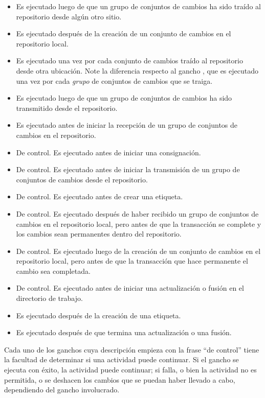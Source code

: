 \begin{itemize}
\item[\small\hook{changegroup}] Es ejecutado luego de que un grupo de
    conjuntos de cambios ha sido traído al repositorio desde algún
    otro sitio.
\item[\small\hook{commit}] Es ejecutado después de la creación de
    un conjunto de cambios en el repositorio local.
\item[\small\hook{incoming}] Es ejecutado una vez por cada conjunto de
    cambios traído al repositorio desde otra ubicación. Note la
    diferencia respecto al gancho , que es ejecutado
    una vez por cada \emph{grupo} de conjuntos de cambios que se
    traiga.
\item[\small\hook{outgoing}] Es ejecutado luego de que un grupo de
    conjuntos de cambios ha sido transmitido desde el repositorio.
\item[\small\hook{prechangegroup}] Es ejecutado antes de iniciar la
    recepción de un grupo de conjuntos de cambios en el repositorio.
\item[\small\hook{precommit}] De control. Es ejecutado antes de
    iniciar una consignación.
\item[\small\hook{preoutgoing}] De control. Es ejecutado antes de
    iniciar la transmisión de un grupo de conjuntos de cambios desde
    el repositorio.
\item[\small\hook{pretag}] De control. Es ejecutado antes de crear una
    etiqueta.
\item[\small\hook{pretxnchangegroup}] De control. Es ejecutado después
    de haber recibido un grupo de conjuntos de cambios en el
    repositorio local, pero antes de que la transacción se complete y
    los cambios sean permanentes dentro del repositorio.
\item[\small\hook{pretxncommit}] De control. Es ejecutado luego de la
    creación de un conjunto de cambios en el repositorio local, pero
    antes de que la transacción que hace permanente el cambio sea
    completada.
\item[\small\hook{preupdate}] De control. Es ejecutado antes de
    iniciar una actualización o fusión en el directorio de trabajo.
\item[\small\hook{tag}] Es ejecutado después de la creación de una
    etiqueta.
\item[\small\hook{update}] Es ejecutado después de que termina una
    actualización o una fusión.
\end{itemize}
Cada uno de los ganchos cuya descripción empieza con la frase
``de control'' tiene la facultad de determinar si una actividad puede
continuar. Si el gancho se ejecuta con éxito, la actividad puede
continuar; si falla, o bien la actividad no es permitida, o se
deshacen los cambios que se puedan haber llevado a cabo, dependiendo
del gancho involucrado.

